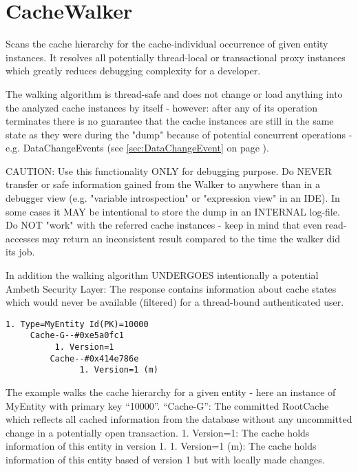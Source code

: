 \section{CacheWalker}
Scans the cache hierarchy for the cache-individual occurrence of given entity instances. It resolves all potentially thread-local or transactional proxy instances which greatly reduces debugging complexity for a developer.\newline

The walking algorithm is thread-safe and does not change or load anything into the analyzed cache instances by itself - however: after any of its operation terminates there is no guarantee that the cache instances are still in the same state as they were during the "dump" because of potential concurrent operations - e.g. DataChangeEvents (see \ref{sec:DataChangeEvent} on page \pageref{sec:DataChangeEvent}).\newline

CAUTION: Use this functionality ONLY for debugging purpose. Do NEVER transfer or safe information gained from the Walker to anywhere than in a debugger view (e.g. "variable introspection" or "expression view" in an IDE). In some cases it MAY be intentional to store the dump in an INTERNAL log-file. Do NOT "work" with the referred cache instances - keep in mind that even read-accesses may return an inconsistent result compared to the time the walker did its job.\newline

In addition the walking algorithm UNDERGOES intentionally a potential Ambeth Security Layer: The response contains information about cache states which would never be available (filtered) for a thread-bound authenticated user.


			
\begin{lstlisting}[caption={Usage example for the ICacheWalker-Beans: Console},style=Bash,captionpos=t]
	1. Type=MyEntity Id(PK)=10000
	 Cache-G--#0xe5a0fc1
		  1. Version=1
		 Cache--#0x414e786e
			   1. Version=1 (m)
\end{lstlisting}

The example walks the cache hierarchy for a given entity - here an instance of MyEntity with primary key ``10000''.
``Cache-G'': The committed RootCache which reflects all cached information from the database without any uncommitted change in a potentially open transaction.
1. Version=1: The cache holds information of this entity in version 1.
1. Version=1 (m): The cache holds information of this entity based of version 1 but with locally made changes.


